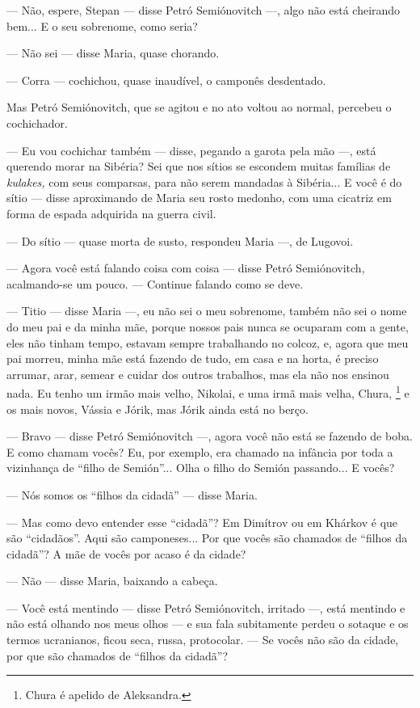 --- Não, espere, Stepan --- disse Petró Semiónovitch ---, algo não está
cheirando bem... E o seu sobrenome, como seria?

--- Não sei --- disse Maria, quase chorando.

--- Corra --- cochichou, quase inaudível, o camponês desdentado.

Mas Petró Semiónovitch, que se agitou e no ato voltou ao normal,
percebeu o cochichador.

--- Eu vou cochichar também --- disse, pegando a garota pela mão ---,
está querendo morar na Sibéria? Sei que nos sítios se escondem muitas
famílias de \emph{kulakes,} com seus comparsas, para não serem mandadas
à Sibéria... E você é do sítio --- disse aproximando de Maria seu rosto
medonho, com uma cicatriz em forma de espada adquirida na guerra civil.

--- Do sítio --- quase morta de susto, respondeu Maria ---, de Lugovoi.

--- Agora você está falando coisa com coisa --- disse Petró
Semiónovitch, acalmando-se um pouco. --- Continue falando como se deve.

--- Titio --- disse Maria ---, eu não sei o meu sobrenome, também não
sei o nome do meu pai e da minha mãe, porque nossos pais nunca se
ocuparam com a gente, eles não tinham tempo, estavam sempre trabalhando
no colcoz, e, agora que meu pai morreu, minha mãe está fazendo de tudo,
em casa e na horta, é preciso arrumar, arar, semear e cuidar dos outros
trabalhos, mas ela não nos ensinou nada. Eu tenho um irmão mais velho,
Nikolai, e uma irmã mais velha, Chura, \footnote{Chura é apelido de
  Aleksandra.} e os mais novos, Vássia e Jórik, mas Jórik ainda está no
berço.

--- Bravo --- disse Petró Semiónovitch ---, agora você não está se
fazendo de boba. E como chamam vocês? Eu, por exemplo, era chamado na
infância por toda a vizinhança de ``filho de Semión''... Olha o filho do
Semión passando... E vocês?

--- Nós somos os ``filhos da cidadã'' --- disse Maria.

--- Mas como devo entender esse ``cidadã''? Em Dimítrov ou em Khárkov é
que são ``cidadãos''. Aqui são camponeses... Por que vocês são chamados
de ``filhos da cidadã''? A mãe de vocês por acaso é da cidade?

--- Não --- disse Maria, baixando a cabeça.

--- Você está mentindo --- disse Petró Semiónovitch, irritado ---, está
mentindo e não está olhando nos meus olhos --- e sua fala subitamente
perdeu o sotaque e os termos ucranianos, ficou seca, russa, protocolar.
--- Se vocês não são da cidade, por que são chamados de ``filhos da
cidadã''?

